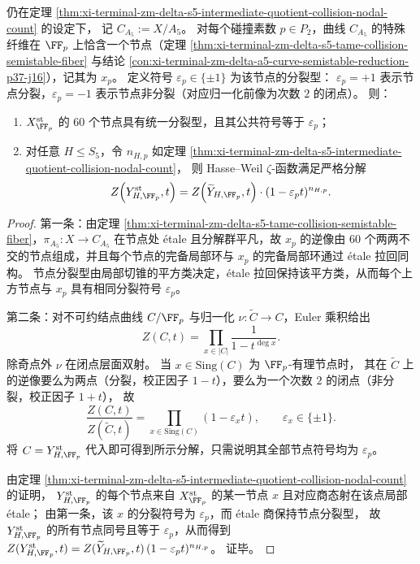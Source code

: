 \begin{theorem}\label{thm:xi-terminal-zm-delta-s5-collision-node-sign-zeta-factorization}
仍在定理 \ref{thm:xi-terminal-zm-delta-s5-intermediate-quotient-collision-nodal-count} 的设定下，
记 \(C_{A_5}:=X/A_5\)。
对每个碰撞素数 \(p\in P_2\)，曲线 \(C_{A_5}\) 的特殊纤维在 \(\FF_p\) 上恰含一个节点（定理 \ref{thm:xi-terminal-zm-delta-s5-tame-collision-semistable-fiber} 与结论 \ref{con:xi-terminal-zm-delta-a5-curve-semistable-reduction-p37-j16}），记其为 \(x_p\)。
定义符号 \(\varepsilon_p\in\{\pm 1\}\) 为该节点的分裂型：
\(\varepsilon_p=+1\) 表示节点分裂，\(\varepsilon_p=-1\) 表示节点非分裂（对应归一化前像为次数 \(2\) 的闭点）。
则：
\begin{enumerate}
  \item \(X^{\mathrm{st}}_{\FF_p}\) 的 \(60\) 个节点具有统一分裂型，且其公共符号等于 \(\varepsilon_p\)；
  \item 对任意 \(H\le S_5\)，令 \(n_{H,p}\) 如定理 \ref{thm:xi-terminal-zm-delta-s5-intermediate-quotient-collision-nodal-count}，
  则 Hasse--Weil \(\zeta\)-函数满足严格分解
  \[
  Z\!\left(Y^{\mathrm{st}}_{H,\FF_p},t\right)
  =Z\!\left(\widetilde Y_{H,\FF_p},t\right)\cdot (1-\varepsilon_p t)^{n_{H,p}}.
  \]
\end{enumerate}
\end{theorem}
\begin{proof}
第一条：由定理 \ref{thm:xi-terminal-zm-delta-s5-tame-collision-semistable-fiber}，\(\pi_{A_5}:X\to C_{A_5}\) 在节点处 \'etale 且分解群平凡，故 \(x_p\) 的逆像由 \(60\) 个两两不交的节点组成，并且每个节点的完备局部环与 \(x_p\) 的完备局部环通过 \'etale 拉回同构。
节点分裂型由局部切锥的平方类决定，\'etale 拉回保持该平方类，从而每个上方节点与 \(x_p\) 具有相同分裂符号 \(\varepsilon_p\)。
\par
第二条：对不可约结点曲线 \(C/\FF_p\) 与归一化 \(\nu:\widetilde C\to C\)，Euler 乘积给出
\[
Z(C,t)=\prod_{x\in|C|}\frac{1}{1-t^{\deg x}}.
\]
除奇点外 \(\nu\) 在闭点层面双射。
当 \(x\in\mathrm{Sing}(C)\) 为 \(\FF_p\)-有理节点时，
其在 \(\widetilde C\) 上的逆像要么为两点（分裂，校正因子 \(1-t\)），要么为一个次数 \(2\) 的闭点（非分裂，校正因子 \(1+t\)），
故
\[
\frac{Z(C,t)}{Z(\widetilde C,t)}=\prod_{x\in\mathrm{Sing}(C)}(1-\varepsilon_x t),
\qquad
\varepsilon_x\in\{\pm 1\}.
\]
将 \(C=Y^{\mathrm{st}}_{H,\FF_p}\) 代入即可得到所示分解，只需说明其全部节点符号均为 \(\varepsilon_p\)。
\par
由定理 \ref{thm:xi-terminal-zm-delta-s5-intermediate-quotient-collision-nodal-count} 的证明，
\(Y^{\mathrm{st}}_{H,\FF_p}\) 的每个节点来自 \(X^{\mathrm{st}}_{\FF_p}\) 的某一节点 \(x\) 且对应商态射在该点局部 \'etale；
由第一条，该 \(x\) 的分裂符号为 \(\varepsilon_p\)，而 \'etale 商保持节点分裂型，
故 \(Y^{\mathrm{st}}_{H,\FF_p}\) 的所有节点同号且等于 \(\varepsilon_p\)，从而得到
\(
Z(Y^{\mathrm{st}}_{H,\FF_p},t)=Z(\widetilde Y_{H,\FF_p},t)\,(1-\varepsilon_p t)^{n_{H,p}}
\)。
证毕。
\end{proof}

